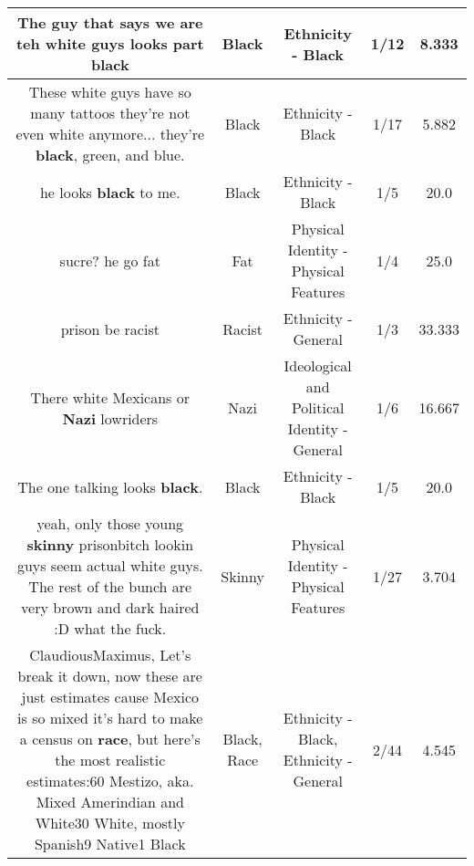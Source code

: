 \documentclass[11pt]{article}
\newlength\mylength
\begin{document}
\begin{center}
\begin{longtable}{|C{.65\mylength}|C{.30\mylength}|C{.12\mylength}|C{.12\mylength}|C{.12\mylength}|}
  \small The guy that says we are teh white guys looks part black\normalsize   & Black & Ethnicity - Black & 1/12 & 8.333 \\  \hline
  \small These white guys have so many tattoos they're not even white anymore... they're \textbf{black}, green, and blue.\normalsize   & Black & Ethnicity - Black & 1/17 & 5.882 \\  \hline
  \small he looks \textbf{black} to me.\normalsize   & Black & Ethnicity - Black & 1/5 & 20.0 \\  \hline
  \small sucre? he go fat\normalsize   & Fat & Physical Identity - Physical Features & 1/4 & 25.0 \\  \hline
  \small prison be racist\normalsize   & Racist & Ethnicity - General & 1/3 & 33.333 \\  \hline
  \small There white Mexicans or \textbf{Nazi} lowriders\normalsize   & Nazi &  Ideological and Political Identity - General & 1/6 & 16.667 \\  \hline
  \small The one talking looks \textbf{black}.\normalsize   & Black & Ethnicity - Black & 1/5 & 20.0 \\  \hline
  \small yeah, only those young \textbf{skinny} prisonbitch lookin guys seem actual white guys. The rest of the bunch are very brown and dark haired :D what the fuck.\normalsize   & Skinny & Physical Identity - Physical Features & 1/27 & 3.704 \\  \hline
  \small ClaudiousMaximus, Let's break it down, now these are just estimates cause Mexico is so mixed it's hard to make a census on \textbf{race}, but here's the most realistic estimates:60 Mestizo, aka. Mixed Amerindian and White30 White, mostly Spanish9 Native1 Black\normalsize   & Black, Race & Ethnicity - Black, Ethnicity - General & 2/44 & 4.545 \\  \hline

\end{longtable}
\end{center}
\end{document}
